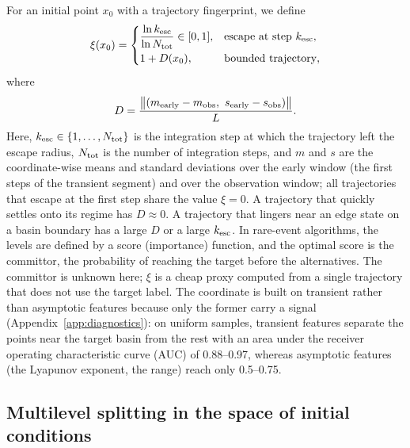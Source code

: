For an initial point $x_0$ with a trajectory fingerprint, we define
\begin{equation}
\xi(x_0)=\begin{cases}\dfrac{\ln k_{\rm esc}}{\ln N_{\rm tot}}\in[0,1], & \text{escape at step } k_{\rm esc},\\[2mm] 1+D(x_0), & \text{bounded trajectory},\end{cases}
\label{eq:xi}
\end{equation}
where
\begin{equation*}
D=\frac{\bigl\|(m_{\rm early}-m_{\rm obs},\ s_{\rm early}-s_{\rm obs})\bigr\|}{L}.
\end{equation*}
Here, $k_{\rm esc}\in\{1,\dots,N_{\rm tot}\}$ is the integration step at which the trajectory left the escape radius, $N_{\rm tot}$ is the number of integration steps, and $m$ and $s$ are the coordinate-wise means and standard deviations over the early window (the first steps of the transient segment) and over the observation window; all trajectories that escape at the first step share the value $\xi=0$. A trajectory that quickly settles onto its regime has $D\approx0$. A trajectory that lingers near an edge state on a basin boundary has a large $D$ or a large $k_{\rm esc}$. In rare-event algorithms, the levels are defined by a score (importance) function, and the optimal score is the committor, the probability of reaching the target before the alternatives.\cite{Lestang2018TAMS,Lucente2022Committor} The committor is unknown here; $\xi$ is a cheap proxy computed from a single trajectory that does not use the target label. The coordinate is built on transient rather than asymptotic features because only the former carry a signal (Appendix~\ref{app:diagnostics}): on uniform samples, transient features separate the points near the target basin from the rest with an area under the receiver operating characteristic curve (AUC) of 0.88--0.97, whereas asymptotic features (the Lyapunov exponent, the range) reach only 0.5--0.75.

\subsection{Multilevel splitting in the space of initial conditions}\label{sec:sus}

